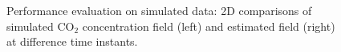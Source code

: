 \documentclass[journal]{IEEEtran}
\begin{document}
\begin{figure}[tbp]
	\centering
	
	
\caption{Performance evaluation on simulated data: 2D comparisons of simulated CO$_2$ concentration field (left) and estimated field (right) at difference time instants.} \label{fig:sim_fil_comparison}
\end{figure}
\end{document}
